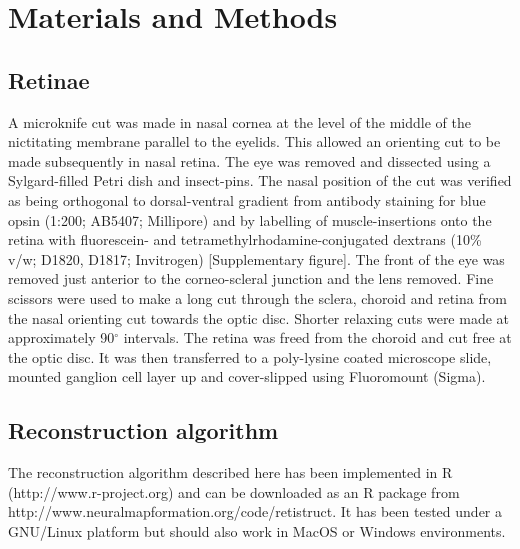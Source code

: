 \documentclass[10pt]{article}
\newcommand{\todo}[1]{{\color{red}[#1]}}
\begin{document}

\section*{Materials and Methods}
\label{retistruct_plos:sec:materials-methods}

\subsection*{Retinae}
\label{retistruct_plos:sec:retinae}

A microknife cut was made in nasal cornea at the level of the middle
of the nictitating membrane parallel to the eyelids. This allowed an
orienting cut to be made subsequently in nasal retina. The eye was
removed and dissected using a Sylgard-filled Petri dish and
insect-pins. The nasal position of the cut was verified as being
orthogonal to dorsal-ventral gradient from antibody staining for blue
opsin (1:200; AB5407; Millipore) and by labelling of muscle-insertions
onto the retina with fluorescein- and tetramethylrhodamine-conjugated
dextrans (10\% v/w; D1820, D1817; Invitrogen)
\todo{Supplementary figure}. The front of the eye was removed just
anterior to the corneo-scleral junction and the lens removed. Fine
scissors were used to make a long cut through the sclera, choroid and
retina from the nasal orienting cut towards the optic disc. Shorter
relaxing cuts were made at approximately 90$^\circ$ intervals. The
retina was freed from the choroid and cut free at the optic disc. It
was then transferred to a poly-lysine coated microscope slide, mounted
ganglion cell layer up and cover-slipped using Fluoromount (Sigma).

\subsection*{Reconstruction algorithm}
\label{retistruct_plos:sec:reconstr-algor}

The reconstruction algorithm described here has been implemented in R
(http://www.r-project.org) and can be downloaded as an R package from
http://www.neuralmapformation.org/code/retistruct. It has been tested
under a GNU/Linux platform but should also work in MacOS or Windows
environments.
\end{document}
